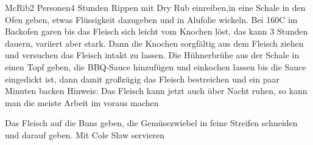 \begin{recipe}{McRib}{2 Personen}{4 Stunden}
Rippen mit Dry Rub einreiben,in eine Schale in den Ofen geben, etwas Flüssigkeit dazugeben und in Alufolie wickeln. Bei 160\0C im Backofen garen bis das Fleisch sich leicht vom Knochen löst, das kann 3 Stunden dauern, variiert aber stark. Dann die Knochen sorgfältig aus dem Fleisch ziehen und versuchen das Fleisch intakt zu lassen. Die Hühnerbrühe aus der Schale in einen Topf geben, die BBQ-Sauce hinzufügen und einkochen lassen bis die Sauce eingedickt ist, dann damit großzügig das Fleisch bestreichen und ein paar Minuten backen
\newline
Hinweis: Das Fleisch kann jetzt auch über Nacht ruhen, so kann man die meiste Arbeit im voraus machen

Das Fleisch auf die Buns geben, die Gemüsezwiebel in feine Streifen schneiden und darauf geben. Mit Cole Slaw servieren 

\end{recipe}


